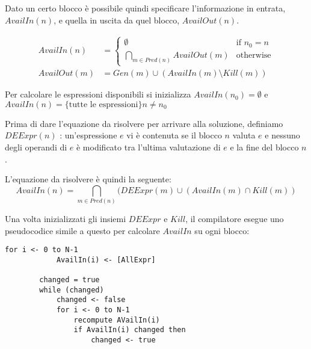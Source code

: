 \documentclass[a4paper, 10pt]{article}
\begin{document}
	Dato un certo blocco è possibile quindi specificare l'informazione in entrata, $AvailIn(n)$, e quella in uscita da quel blocco, $AvailOut(n)$.

	\begin{align*}
		AvailIn(n) &= \begin{cases}
		\emptyset &\text{if } n_0 = n \\
		\bigcap\limits_{m \in Pred(n)} AvailOut(m) &\text{otherwise}
		\end{cases} \\
		AvailOut(m) &= Gen(m) \cup (AvailIn(m) \setminus Kill(m))
	\end{align*}
	
	Per calcolare le espressioni disponibili si inizializza $AvailIn(n_0) = \emptyset$ e $AvailIn(n) = \lbrace \text{tutte le espressioni} \rbrace n \neq n_0$
	
	Prima di dare l'equazione da risolvere per arrivare alla soluzione, definiamo $DEExpr(n)$ : un'espressione $e$ vi è contenuta se il blocco $n$ valuta $e$ e nessuno degli operandi di $e$ è modificato tra l'ultima valutazione di $e$ e la fine del blocco $n$.
	
	L'equazione da risolvere è quindi la seguente:
	\[
		AvailIn(n) = \bigcap\limits_{m \in Pred(n)} (DEExpr(m) \cup (AvailIn(m) \cap Kill(m))
	\]
	
	Una volta inizializzati gli insiemi $DEExpr$ e $Kill$, il compilatore esegue uno pseudocodice simile a questo per calcolare $AvailIn$ su ogni blocco:
	
	\begin{lstlisting}[frame=tb]
		for i <- 0 to N-1
			AvailIn(i) <- [AllExpr]
		
		changed = true
		while (changed)
			changed <- false
			for i <- 0 to N-1
				recompute AVailIn(i)
				if AvailIn(i) changed then
					changed <- true
	\end{lstlisting}
	
	
	
	
	
	
	
	
	
	
	
\end{document}
